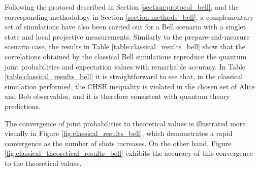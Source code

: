 Following the protocol described in Section \ref{section:protocol_bell}, and the corresponding methodology in Section \ref{section:methods_bell}, a complementary set of simulations have also been carried out for a Bell scenario with a singlet state and local projective measurements. Similarly to the prepare-and-measure scenario case, the results in Table \ref{table:classical_results_bell} show that the correlations obtained by the classical Bell simulations reproduce the quantum joint probabilities and expectation values with remarkable accuracy. In Table \ref{table:classical_results_bell} it is straightforward to see that, in the classical simulation performed, the CHSH inequality is violated in the chosen set of Alice and Bob observables, and it is therefore consistent with quantum theory predictions. 

The convergence of joint probabilities to theoretical values is illustrated more visually in Figure \ref{fig:classical_results_bell}, which demonstrates a rapid convergence as the number of shots increases. On the other hand, Figure \ref{fig:classical_theoretical_results_bell} exhibits the accuracy of this convergence to the theoretical values.

